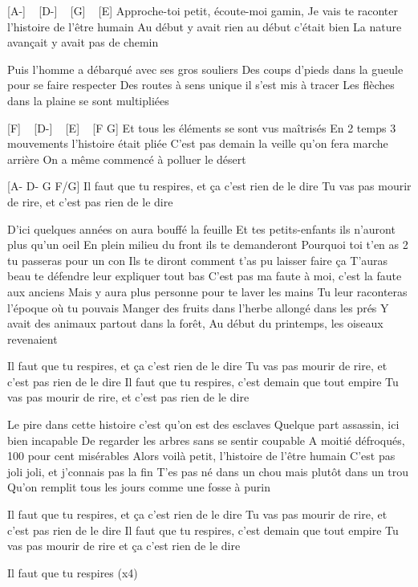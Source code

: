 \begin{guitar}

[A-] ~ [D-] ~ [G] ~ [E]
Approche-toi petit, écoute-moi gamin,
Je vais te raconter l'histoire de l'être humain
Au début y avait rien au début c'était bien
La nature avançait y avait pas de chemin

Puis l'homme a débarqué avec ses gros souliers
Des coups d'pieds dans la gueule pour se faire respecter
Des routes à  sens unique il s'est mis à  tracer
Les flèches dans la plaine se sont multipliées

[F] ~ [D-] ~ [E] ~ [F G]
Et tous les éléments se sont vus maîtrisés
En 2 temps 3 mouvements l'histoire était pliée
C'est pas demain la veille qu'on fera marche arrière
On a même commencé à  polluer le désert

[A-  D-  G  F/G]
Il faut que tu respires, et ça c'est rien de le dire
Tu vas pas mourir de rire, et c'est pas rien de le dire

D'ici quelques années on aura bouffé la feuille
Et tes petits-enfants ils n'auront plus qu'un oeil
En plein milieu du front ils te demanderont
Pourquoi toi t'en as 2 tu passeras pour un con
Ils te diront comment t'as pu laisser faire ça
T'auras beau te défendre leur expliquer tout bas
C'est pas ma faute à  moi, c'est la faute aux anciens
Mais y aura plus personne pour te laver les mains
Tu leur raconteras l'époque où tu pouvais
Manger des fruits dans l'herbe allongé dans les prés
Y avait des animaux partout dans la forêt,
Au début du printemps, les oiseaux revenaient

Il faut que tu respires, et ça c'est rien de le dire
Tu vas pas mourir de rire, et c'est pas rien de le dire
Il faut que tu respires, c'est demain que tout empire
Tu vas pas mourir de rire, et c'est pas rien de le dire

Le pire dans cette histoire c'est qu'on est des esclaves
Quelque part assassin, ici bien incapable
De regarder les arbres sans se sentir coupable
A moitié défroqués, 100 pour cent misérables
Alors voilà  petit, l'histoire de l'être humain
C'est pas joli joli, et j'connais pas la fin
T'es pas né dans un chou mais plutôt dans un trou
Qu'on remplit tous les jours comme une fosse à  purin

Il faut que tu respires, et ça c'est rien de le dire
Tu vas pas mourir de rire, et c'est pas rien de le dire
Il faut que tu respires, c'est demain que tout empire
Tu vas pas mourir de rire et ça c'est rien de le dire

Il faut que tu respires (x4)


\end{guitar}